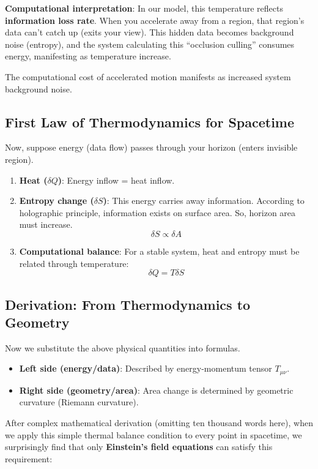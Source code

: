 \textbf{Computational interpretation}:
In our model, this temperature reflects \textbf{information loss rate}. When you accelerate away from a region, that region's data can't catch up (exits your view). This hidden data becomes background noise (entropy), and the system calculating this ``occlusion culling'' consumes energy, manifesting as temperature increase.

The computational cost of accelerated motion manifests as increased system background noise.

\subsection{First Law of Thermodynamics for Spacetime}

Now, suppose energy (data flow) passes through your horizon (enters invisible region).

\begin{enumerate}
\item \textbf{Heat ($\delta Q$)}: Energy inflow = heat inflow.
\item \textbf{Entropy change ($\delta S$)}: This energy carries away information. According to holographic principle, information exists on surface area. So, horizon area must increase.
\[
\delta S \propto \delta A
\]
\item \textbf{Computational balance}: For a stable system, heat and entropy must be related through temperature:
\[
\delta Q = T \delta S
\]
\end{enumerate}

\subsection{Derivation: From Thermodynamics to Geometry}

Now we substitute the above physical quantities into formulas.

\begin{itemize}
\item \textbf{Left side (energy/data)}: Described by energy-momentum tensor $T_{\mu\nu}$.
\item \textbf{Right side (geometry/area)}: Area change is determined by geometric curvature (Riemann curvature).
\end{itemize}

After complex mathematical derivation (omitting ten thousand words here), when we apply this simple thermal balance condition to every point in spacetime, we surprisingly find that only \textbf{Einstein's field equations} can satisfy this requirement:

